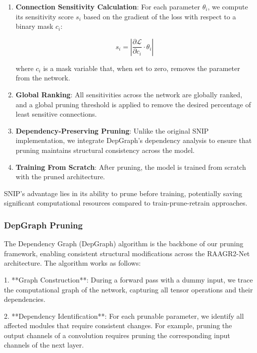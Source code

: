 \documentclass[12pt,a4paper]{article}
\begin{document}
\begin{enumerate}
\item \textbf{Connection Sensitivity Calculation}: For each parameter $\theta_i$, we compute its sensitivity score $s_i$ based on the gradient of the loss with respect to a binary mask $c_i$:
   
   \begin{equation}
   s_i = \left|\frac{\partial \mathcal{L}}{\partial c_i} \cdot \theta_i \right|
   \end{equation}
   
   where $c_i$ is a mask variable that, when set to zero, removes the parameter from the network.

\item \textbf{Global Ranking}: All sensitivities across the network are globally ranked, and a global pruning threshold is applied to remove the desired percentage of least sensitive connections.

\item \textbf{Dependency-Preserving Pruning}: Unlike the original SNIP implementation, we integrate DepGraph's dependency analysis \cite{Fang2023DepGraph} to ensure that pruning maintains structural consistency across the model.

\item \textbf{Training From Scratch}: After pruning, the model is trained from scratch with the pruned architecture.
\end{enumerate}

SNIP's advantage lies in its ability to prune before training, potentially saving significant computational resources compared to train-prune-retrain approaches.

\subsubsection{DepGraph Pruning}

The Dependency Graph (DepGraph) algorithm \cite{Fang2023DepGraph, Cai2022Dependency} is the backbone of our pruning framework, enabling consistent structural modifications across the RAAGR2-Net architecture. The algorithm works as follows:

1. **Graph Construction**: During a forward pass with a dummy input, we trace the computational graph of the network, capturing all tensor operations and their dependencies.

2. **Dependency Identification**: For each prunable parameter, we identify all affected modules that require consistent changes. For example, pruning the output channels of a convolution requires pruning the corresponding input channels of the next layer.
\end{document}
